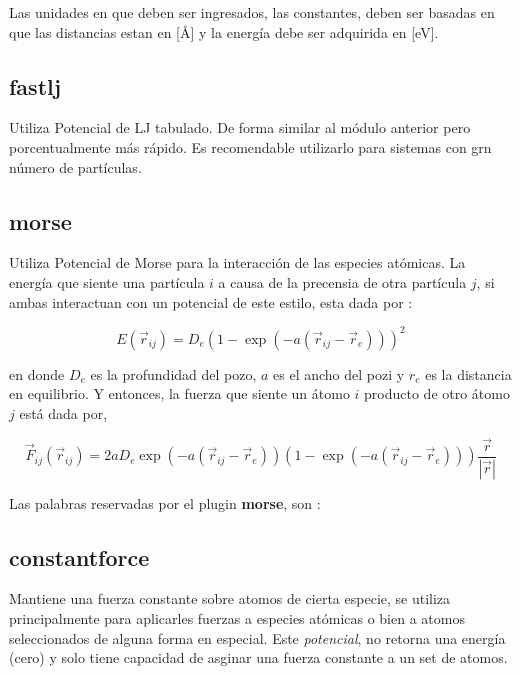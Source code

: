 Las unidades en que deben ser ingresados, las constantes, deben ser basadas en que las distancias estan en [\AA] y la energ\'ia debe ser adquirida en [eV].


\subsection{fastlj}
Utiliza Potencial de LJ tabulado. De forma similar al m\'odulo anterior pero porcentualmente m\'as r\'apido. Es recomendable utilizarlo para sistemas con grn n\'umero de part\'iculas.

\subsection{morse}
Utiliza Potencial de Morse para la interacci\'on de las especies at\'omicas. La energ\'ia que siente una part\'icula $i$ a causa de la precensia de otra part\'icula $j$, si ambas interactuan con un potencial de este estilo, esta dada por :

$$E(\vec{r}_{ij}) = D_e\left(1-\exp(-a(\vec{r}_{ij}-\vec{r}_e))\right)^2$$

en donde $D_e$ es la profundidad del pozo, $a$ es el ancho del pozi y $r_e$ es la distancia en equilibrio. Y entonces, la fuerza que siente un \'atomo $i$ producto de otro \'atomo $j$ est\'a dada por,

$$\vec{F}_{ij} ( \vec{r}_{ij}) = 2aD_e\exp(-a(\vec{r}_{ij}-\vec{r}_e))\left(1-\exp(-a(\vec{r}_{ij}-\vec{r}_e))\right)\frac{\vec{r}}{|\vec{r}|}$$

Las palabras reservadas por el plugin \textbf{morse}, son :



\subsection{constantforce}
Mantiene una fuerza constante sobre atomos de cierta especie, se utiliza principalmente para aplicarles fuerzas a especies at\'omicas o bien a atomos seleccionados de alguna forma en especial. Este \textit{potencial}, no retorna una energ\'ia (cero) y solo tiene capacidad de asginar una fuerza constante a un set de atomos.

